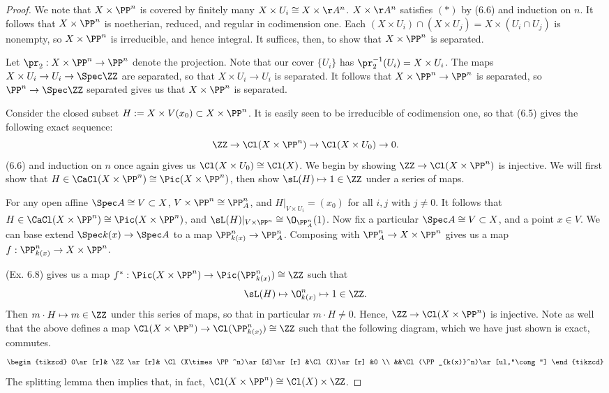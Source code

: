 \documentclass[12pt]{amsart}
\begin{document}
\begin{proof}
  We note that $X\times \PP^n$ is covered by finitely many $X\times U_i\cong X\times \AA^n$.
  $X\times \AA^n$ satisfies $(*)$ by (6.6) and induction on $n$.
  It follows that $X\times \PP^n$ is noetherian, reduced, and regular in codimension one.
  Each $(X\times U_i)\cap(X\times U_j)=X\times (U_i\cap U_j)$ is nonempty, so $X\times \PP^n$ is irreducible, and hence integral.
  It suffices, then, to show that $X\times\PP^n$ is separated.

  Let $\pr_2:X\times \PP^n\to \PP^n$ denote the projection.
  Note that our cover $\{U_i\}$ has $\pr_2^{-1}(U_i)=X\times U_i$.
  The maps $X\times U_i\to U_i\to \Spec \ZZ$ are separated, so that $X\times U_i\to U_i$ is separated.
  It follows that $X\times \PP^n\to \PP^n$ is separated, so $\PP^n\to \Spec \ZZ$ separated gives us that $X\times \PP^n$ is separated.

  Consider the closed subset $H:=X\times V(x_0)\subset X\times \PP^n$.
  It is easily seen to be irreducible of codimension one, so that (6.5) gives the following exact sequence:
  \[
    \ZZ\to \Cl(X\times \PP^n)\to \Cl(X\times U_0)\to 0.
  \] 
  (6.6) and induction on $n$ once again gives us $\Cl(X\times U_0)\cong \Cl(X)$.
  We begin by showing $\ZZ\to \Cl(X\times \PP^n)$ is injective.
  We will first show that $H\in \CaCl (X\times \PP^n)\cong \Pic(X\times \PP^n)$, then show $\sL(H)\mapsto 1\in \ZZ$ under a series of maps.

  For any open affine $\Spec A\cong V\subset X$, $V\times \PP^n\cong \PP^n_A$, and $H|_{V\times U_i}= (x_0)$ for all $i,j$ with $j\neq 0$.
  It follows that $H\in \CaCl (X\times \PP^n)\cong \Pic(X\times \PP^n)$, and $\sL(H)|_{V\times \PP^n}\cong\O_{\PP^n_{A}}(1)$.
  Now fix a particular $\Spec A\cong V\subset X$, and a point $x\in V$.
  We can base extend $\Spec k(x)\to \Spec A$ to a map $\PP^n_{k(x)}\to \PP^n_A$.
  Composing with $\PP^n_A\to X\times \PP^n$ gives us a map $f:\PP^n_{k(x)}\to X\times \PP^n$.

  (Ex. 6.8) gives us a map $f^*:\Pic(X\times \PP^n)\to \Pic(\PP^n_{k(x)})\cong \ZZ$ such that 
  \[
    \sL(H)\mapsto \O_{k(x)}^n\mapsto 1\in \ZZ.
  \]
  Then $m\cdot H\mapsto m\in \ZZ$ under this series of maps, so that in particular $m\cdot H\neq 0$.
  Hence, $\ZZ\to \Cl(X\times \PP^n)$ is injective.
  Note as well that the above defines a map $\Cl(X\times \PP^n)\to \Cl(\PP^n_{k(x)})\cong \ZZ$ such that the following diagram, which we have just shown is exact, commutes.
  \[
    \begin{tikzcd}
      0\ar[r]& \ZZ\ar[r]& \Cl(X\times \PP^n)\ar[d]\ar[r] &\Cl(X)\ar[r] &0 \\
             &&\Cl(\PP_{k(x)}^n)\ar[ul,"\cong"]
    \end{tikzcd}
  \] 
  The splitting lemma then implies that, in fact, $\Cl(X\times \PP^n)\cong \Cl(X)\times \ZZ$.
\end{proof}
\end{document}
